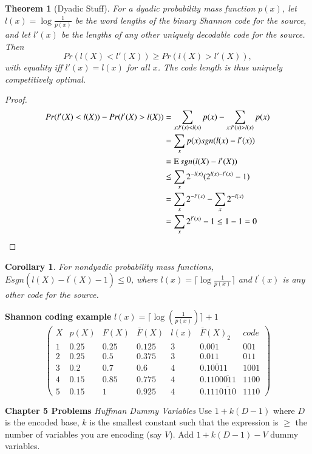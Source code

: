 \documentclass[10pt]{article}
\DeclareMathOperator*{\E}{\mbox{\text{E}}}
\newtheorem{thm}{Theorem}[section]
\newtheorem{corollary}{Corollary}[section]
\begin{document}
\begin{tiny}
\begin{multicols}{3}
\begin{thm}[Dyadic Stuff] \label{thm: dyadic}
For a dyadic probability mass function $p(x)$, let $l(x) = \log \frac{1}{p(x)}$ be the word lengths of the binary Shannon code for the source, and let $l'(x)$ be the lengths of any other uniquely decodable code for the source. Then 
\[Pr(l(X) < l'(X)) \geq Pr(l(X) > l'(X)),\] 
with equality iff $l'(x) = l(x)$ for all $x$. The code length is thus uniquely competitively optimal.
\end{thm}
\begin{proof}
\begin{align*}
Pr(l'(X) < l(X)) - Pr(l'(X) > l(X)) &= \sum_{x:l'(x)<l(x)} p(x) - \sum_{x:l'(x)>l(x)} p(x)\\
&=\sum_x p(x)sgn(l(x) - l'(x)) \\
&= \E sgn(l(X) - l'(X)) \\
&\leq \sum_x 2^{-l(x)} (2^{l(x)-l'(x)} - 1)\\
&=\sum_x 2^{-l'(x)} - \sum_x 2^{-l(x)} \\
&=\sum_x 2^{l'(x)} - 1 \leq 1-1 = 0 
\end{align*}
\end{proof}
\begin{corollary}For nondyadic probability mass functions,
$E sgn(l(X) - l^{'}(X) - 1) \leq 0$, where $l(x) = \lceil \log \frac {1}{p(x)} \rceil$ and $l^{'}(x)$ is any other code for the source.
\end{corollary}

\textbf{\scriptsize Shannon coding example}
$l(x)= \lceil \log(\frac{1}{p(x)}) \rceil + 1$
\[
\begin{pmatrix}
    X & p(X) & F(X)  & \overline{F}(X) & l(x) & \overline{F}(X)_{2} & code  \\
      1 & 0.25 & 0.25 & 0.125 & 3 & 0.001 & 001\\ 
      2 & 0.25 & 0.5 & 0.375 & 3 & 0.011 & 011\\ 
      3 & 0.2 & 0.7 & 0.6 & 4 & 0.\overline{10011} & 1001\\ 
      4 & 0.15 & 0.85 & 0.775 & 4 & 0.110 \overline{0011} & 1100\\ 
      5 & 0.15 & 1 & 0.925 & 4 & 0.111\overline{0110} & 1110
\end{pmatrix}
\]


\textbf{\scriptsize Chapter 5 Problems}
\textit{Huffman Dummy Variables}
Use $1+k(D-1)$ where $D$ is the encoded base, $k$ is the smallest constant such that the expression is $\geq$ the number of variables you are encoding (say $V$). Add $1+k(D-1) - V$ dummy variables.


\end{multicols}
\end{tiny}
\end{document}
